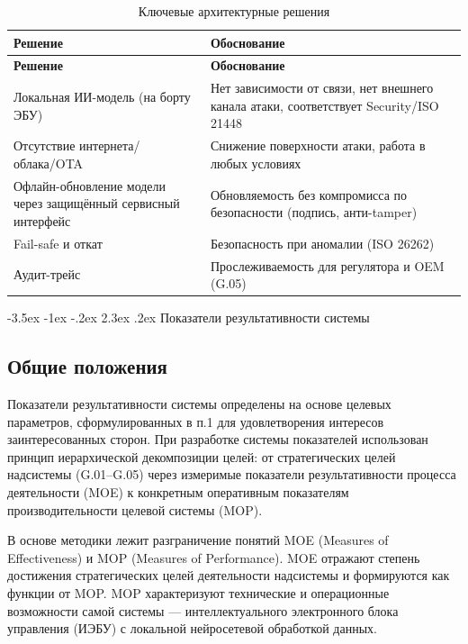 \documentclass[14pt, a4paper]{extarticle}
\makeatletter
\renewcommand\section{\clearpage\@startsection{section}{1}{1.25cm}%
	{-3.5ex \@plus -1ex \@minus -.2ex}%
	{2.3ex \@plus.2ex}%
	{%
		\bfseries
		\fontsize{16}{1.5}\selectfont
}}
\makeatother
\begin{document}
		\vspace{\parindent}
		\noindent
		\begin{xltabular}{\textwidth}{|L|L|}
			\caption{Ключевые архитектурные решения}\label{tab:t2}\\
			\hline
			\textbf{Решение} & \textbf{Обоснование} \\
			\hline
			\endfirsthead
			\hline
			\textbf{Решение} & \textbf{Обоснование} \\
			\hline
			\endhead
			\hline
			\endfoot
			\hline
			\endlastfoot
			Локальная ИИ-модель (на борту ЭБУ) & Нет зависимости от связи, нет внешнего канала атаки, соответствует Security/ISO 21448 \\
			\hline
			Отсутствие интернета/облака/OTA & Снижение поверхности атаки, работа в любых условиях\\
			\hline
			Офлайн-обновление модели через защищённый сервисный интерфейс & Обновляемость без компромисса по безопасности (подпись, анти-tamper)\\
			\hline
			Fail-safe и откат & Безопасность при аномалии (ISO 26262)\\
			\hline
			Аудит-трейс & Прослеживаемость для регулятора и OEM (G.05)\\
			\hline
		\end{xltabular}
		\vspace{\parindent}
		
		
		\section{Показатели результативности системы}
			\subsection{Общие положения}
				
				Показатели результативности системы определены на основе целевых параметров, сформулированных в п.1 для удовлетворения интересов заинтересованных сторон. При разработке системы показателей использован принцип иерархической декомпозиции целей: от стратегических целей надсистемы (G.01–G.05) через измеримые показатели результативности процесса деятельности (MOE) к конкретным оперативным показателям производительности целевой системы (MOP).
				
				В основе методики лежит разграничение понятий MOE (Measures of Effectiveness) и MOP (Measures of Performance). MOE отражают степень достижения стратегических целей деятельности надсистемы и формируются как функции от MOP. MOP характеризуют технические и операционные возможности самой системы — интеллектуального электронного блока управления (ИЭБУ) с локальной нейросетевой обработкой данных.
				
\end{document}
